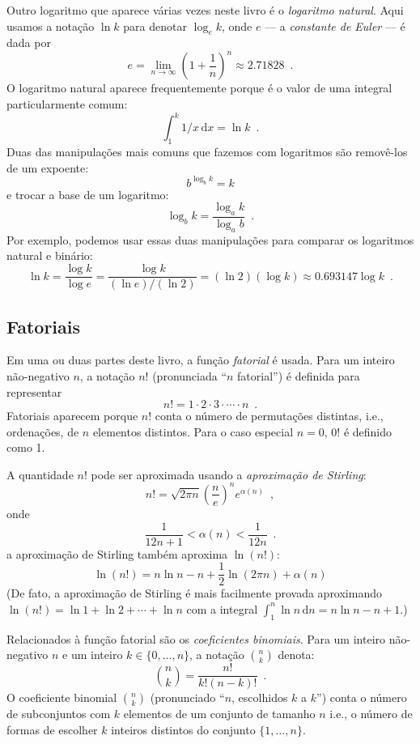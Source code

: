 %
%
Outro logaritmo que aparece várias vezes neste livro é o 
\emph{logaritmo natural}. Aqui usamos a notação $\ln k$ para denotar 
$\log_e k$, onde $e$ --- a \emph{constante de Euler} --- é dada por 
%
%
\[
   e = \lim_{n\rightarrow\infty} \left(1+\frac{1}{n}\right)^n
   \approx  2.71828 \enspace .
\]
O logaritmo natural aparece frequentemente porque é o valor
de uma integral particularmente comum:
\[
    \int_{1}^{k} 1/x\,\mathrm{d}x  = \ln k \enspace .
\]
Duas das manipulações mais comuns que fazemos com logaritmos são
removê-los de um expoente:
\[
    b^{\log_b k} = k
\]
e trocar a base de um logaritmo:
\[
    \log_b k = \frac{\log_a k}{\log_a b} \enspace .
\]
Por exemplo, podemos usar essas duas manipulações para comparar os logaritmos natural e binário:
\[
   \ln k = \frac{\log k}{\log e} = \frac{\log k}{(\ln e)/(\ln 2)} = 
    (\ln 2)(\log k) \approx 0.693147\log k \enspace .
\]

\subsection{Fatoriais}

%
Em uma ou duas partes deste livro,
a função \emph{fatorial} é usada.
Para um inteiro não-negativo $n$, a notação $n!$ (pronunciada ``$n$ fatorial'') é definida para representar 
\[
   n! = 1\cdot2\cdot3\cdot\cdots\cdot n \enspace .
\]
Fatoriais aparecem porque $n!$ conta o número de permutações distintas, i.e., ordenações, de $n$ elementos distintos. 
%
Para o caso especial $n=0$, $0!$  é definido como 1. 

%
A quantidade $n!$ pode ser aproximada usando a \emph{aproximação de Stirling}:
\[
	n! 
   = \sqrt{2\pi n}\left(\frac{n}{e}\right)^{n}e^{\alpha(n)} \enspace ,
\]
onde
\[  
   \frac{1}{12n+1} <  \alpha(n) < \frac{1}{12n}  \enspace .
\]
a aproximação de Stirling também aproxima $\ln(n!)$:
\[
   \ln(n!) = n\ln n - n + \frac{1}{2}\ln(2\pi n) + \alpha(n)
\]
(De fato, a aproximação de Stirling é mais facilmente provada aproximando
$\ln(n!)=\ln 1 + \ln 2  + \cdots + \ln n$ com a integral
$\int_1^n \ln n\,\mathrm{d}n = n\ln n - n +1$.)

%
Relacionados à função fatorial são os 
\emph{coeficientes binomiais}.
Para um inteiro não-negativo $n$ e um inteiro $k\in\{0,\ldots,n\}$,
a notação $\binom{n}{k}$ denota:
\[
   \binom{n}{k} = \frac{n!}{k!(n-k)!} \enspace .
\]
O coeficiente binomial
 $\binom{n}{k}$ (pronunciado ``$n$, escolhidos $k$ a $k$'')
 conta o número de subconjuntos com $k$ elementos de um conjunto de tamanho $n$ 
i.e., o número de formas de escolher $k$ inteiros distintos do conjunto $\{1,\ldots,n\}$.

